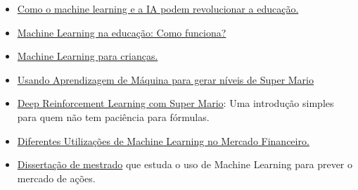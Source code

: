 \documentclass[12pt]{article}
\begin{document}
            \begin{itemize}
            
             \item
             \href{https://itforum.com.br/colunas/como-o-machine-learning-e-a-ia-podem-revolucionar-a-educacao/}{Como o machine learning e a IA podem revolucionar a educação.}

            
             \item
             \href{https://cer.sebrae.com.br/machine-learning-na-educacao-como-funciona/}{Machine Learning na educação: Como funciona?}

            
             \item
             \href{https://machinelearningforkids.co.uk/?lang=pt-br#!/about}{Machine Learning para crianças.
}
            
             \item   
             \href{https://medium.com/machina-sapiens/aprendizagem-de-m\%C3\%A1quina-\%C3\%A9-divertido-parte-2-7c00d034e1d5}{ Usando Aprendizagem de Máquina para gerar níveis de Super Mario}
            
             \item
             \href{https://paulovasconcellos.com.br/explicando-deep-reinforcement-learning-com-super-mario-ao-inv\%C3\%A9s-de-matem\%C3\%A1tica-4c77392cc733}{Deep Reinforcement Learning com Super Mario}: Uma introdução simples para quem não tem paciência para fórmulas.
             
             \item  
             \href{https://minerandodados.com.br/diferentes-utilizacoes-de-machine-learning-no-mercado-financeiro/}{Diferentes Utilizações de Machine Learning no Mercado Financeiro.}
             
             \item 
             \href{http://bibliotecadigital.fgv.br/dspace/bitstream/handle/10438/27999/carolina_calio_nogueira_VF.pdf?sequence=1&isAllowed=y}{Dissertação de mestrado} que estuda o uso de Machine Learning para prever o mercado de ações.
             
            \end{itemize}

        
          

        
\end{document}
